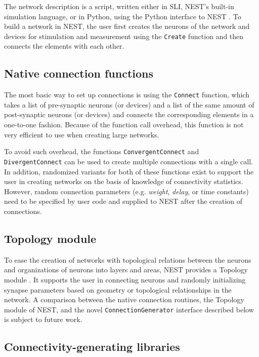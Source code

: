 \documentclass{frontiersSCNS} %
\begin{document}
The network description is a script, written either in SLI, NEST's
built-in simulation language, or in Python, using the Python interface
to NEST \citep[PyNEST;][]{Eppler09_12}. To build a network in NEST,
the user first creates the neurons of the network and devices for
stimulation and measurement using the \verb|Create| function and then
connects the elements with each other.

\subsection{Native connection functions}

The most basic way to set up connections is using the \verb|Connect|
function, which takes a list of pre-synaptic neurons (or devices) and
a list of the same amount of post-synaptic neurons (or devices) and
connects the corresponding elements in a one-to-one fashion. Because
of the function call overhead, this function is not very efficient to
use when creating large networks.

To avoid such overhead, the functions \verb|ConvergentConnect| and
\verb|DivergentConnect| can be used to create multiple connections
with a single call. In addition, randomized variants for both of these
functions exist to support the user in creating networks on the basis
of knowledge of connectivity statistics. However, random connection
parameters (e.g. \emph{weight}, \emph{delay}, or time constants) need
to be specified by user code and supplied to NEST after the creation
of connections.

\subsection{Topology module}

To ease the creation of networks with topological relations between
the neurons and organizations of neurons into layers and areas, NEST
provides a Topology module \citep{Plesser_13}. It supports the user in
connecting neurons and randomly initializing synapse parameters based
on geometry or topological relationships in the network. A comparison
between the native connection routines, the Topology module of NEST,
and the novel \verb|ConnectionGenerator| interface described below is
subject to future work.

\subsection{Connectivity-generating libraries}
\end{document}
